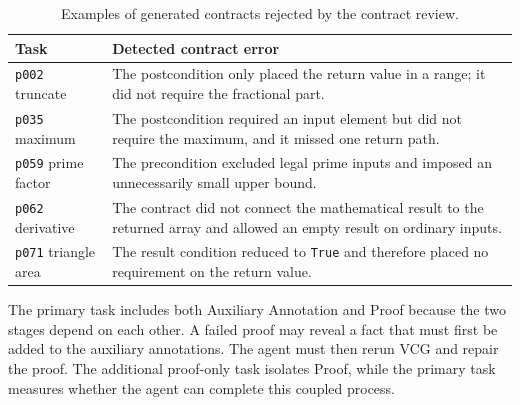 \begin{table}[!t]
\centering
\caption{Examples of generated contracts rejected by the contract review.}
\label{tab:app-judge-examples}
\scriptsize
\setlength{\tabcolsep}{3pt}
\begin{tabular}{L{0.25\columnwidth}L{0.67\columnwidth}}
\toprule
\textbf{Task} & \textbf{Detected contract error} \\
\midrule
{} \texttt{p002} truncate & The postcondition only placed the return value in a range; it did not require the fractional part. \\
\texttt{p035} maximum & The postcondition required an input element but did not require the maximum, and it missed one return path. \\
 \texttt{p059} prime factor & The precondition excluded legal prime inputs and imposed an unnecessarily small upper bound. \\
\texttt{p062} derivative & The contract did not connect the mathematical result to the returned array and allowed an empty result on ordinary inputs. \\
 \texttt{p071} triangle area & The result condition reduced to \texttt{True} and therefore placed no requirement on the return value. \\
\bottomrule
\end{tabular}
\end{table}

The primary task includes both Auxiliary Annotation and Proof because the two stages depend on each other. A failed proof may reveal a fact that must first be added to the auxiliary annotations. The agent must then rerun VCG and repair the proof. The additional proof-only task isolates Proof, while the primary task measures whether the agent can complete this coupled process.
